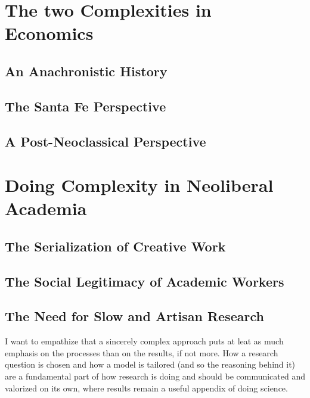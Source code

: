 \documentclass[a4paper, headings=standardclasses]{scrartcl}
\begin{document}
	\section{The two Complexities in Economics}
	\subsection{An Anachronistic History}
	
	\subsection{The Santa Fe Perspective}
	
	\subsection{A Post-Neoclassical Perspective}
	
	\section{Doing Complexity in Neoliberal Academia}
	\subsection{The Serialization of Creative Work}
	
    \subsection{The Social Legitimacy of Academic Workers}

	\subsection{The Need for Slow and Artisan Research}
	I want to empathize that a sincerely complex approach puts at leat as much emphasis on the processes than on the results, if not more. How a research question is chosen and how a model is tailored (and so the reasoning behind it) are a fundamental part of how research is doing and should be communicated and valorized on its own, where results remain a useful appendix of doing science.

	\printbibliography
	
\end{document}
